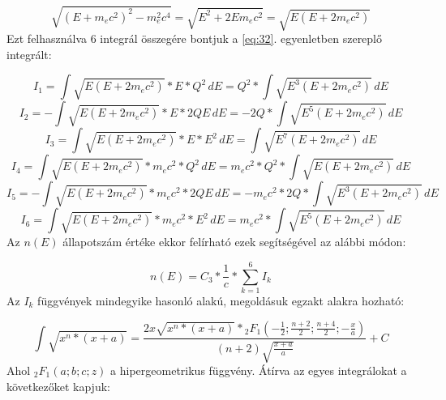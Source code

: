 \begin{equation} \label{eq:33}
\sqrt{\left( E + m_{e} c^{2} \right)^{2} - m_{e}^{2} c^{4}}
=
\sqrt{E^{2} + 2Em_{e}c^{2}}
=
\sqrt{E \left( E + 2m_{e}c^{2} \right)}
\end{equation}
Ezt felhasználva 6 integrál összegére bontjuk a \ref{eq:32}. egyenletben szereplő integrált:

\begin{equation} \label{eq:34}
I_{1}
=
\int \sqrt{E \left( E + 2m_{e}c^{2} \right)} * E * Q^{2}\,dE
=
Q^{2} * \int \sqrt{E^{3} \left( E + 2m_{e}c^{2} \right)}\,dE
\end{equation}
\begin{equation} \label{eq:35}
I_{2}
=
- \int \sqrt{E \left( E + 2m_{e}c^{2} \right)} * E * 2QE\,dE
=
- 2Q * \int \sqrt{E^{5} \left( E + 2m_{e}c^{2} \right)}\,dE
\end{equation}
\begin{equation} \label{eq:36}
I_{3}
=
\int \sqrt{E \left( E + 2m_{e}c^{2} \right)} * E * E^{2}\,dE
=
\int \sqrt{E^{7} \left( E + 2m_{e}c^{2} \right)}\,dE
\end{equation}
\begin{equation} \label{eq:37}
I_{4}
=
\int \sqrt{E \left( E + 2m_{e}c^{2} \right)} * m_{e} c^{2} * Q^{2}\,dE
=
m_{e} c^{2} * Q^{2} * \int \sqrt{E \left( E + 2m_{e}c^{2} \right)}\,dE
\end{equation}
\begin{equation} \label{eq:38}
I_{5}
=
- \int \sqrt{E \left( E + 2m_{e}c^{2} \right)} * m_{e} c^{2} * 2QE\,dE
=
- m_{e} c^{2} * 2Q * \int \sqrt{E^{3} \left( E + 2m_{e}c^{2} \right)}\,dE
\end{equation}
\begin{equation} \label{eq:39}
I_{6}
=
\int \sqrt{E \left( E + 2m_{e}c^{2} \right)} * m_{e} c^{2} * E^{2}\,dE
=
m_{e} c^{2} * \int \sqrt{E^{5} \left( E + 2m_{e}c^{2} \right)}\,dE
\end{equation}
Az $n \left( E \right)$ állapotszám értéke ekkor felírható ezek segítségével az alábbi módon:

\begin{equation} \label{eq:40}
n \left( E \right)
=
C_{3} * \frac{1}{c} * \sum_{k = 1}^{6} I_{k}
\end{equation}
Az $I_{k}$ függvények mindegyike hasonló alakú, megoldásuk egzakt alakra hozható:

\begin{equation} \label{eq:41}
\int \sqrt{x^{n} * \left( x + a \right)}
=
\frac{2x \sqrt{x^{n} * \left( x + a \right)} * {}_{2}F_{1} \left( -\frac{1}{2}; \frac{n+2}{2}; \frac{n+4}{2}; -\frac{x}{a} \right)}{\left( n + 2 \right) \sqrt{\frac{x + a}{a}}} + C
\end{equation}
Ahol ${}_{2}F_{1} \left( a; b; c; z \right)$ a hipergeometrikus függvény. Átírva az egyes integrálokat a következőket kapjuk:

